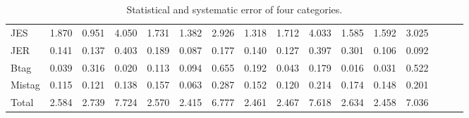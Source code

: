 \begin{sidewaystable}[p]
\begin{tabular}{|l|ccc|ccc|ccc|ccc|ccc|}
  JES                                        & 1.870 & 0.951 & 4.050 & 1.731 & 1.382 & 2.926 & 1.318 & 1.712 & 4.033 & 1.585 & 1.592 & 3.025 \\ 
  JER                                        & 0.141 & 0.137 & 0.403 & 0.189 & 0.087 & 0.177 & 0.140 & 0.127 & 0.397 & 0.301 & 0.106 & 0.092 \\ 
  Btag                                       & 0.039 & 0.316 & 0.020 & 0.113 & 0.094 & 0.655 & 0.192 & 0.043 & 0.179 & 0.016 & 0.031 & 0.522 \\ 
  Mistag                                     & 0.115 & 0.121 & 0.138 & 0.157 & 0.063 & 0.287 & 0.152 & 0.120 & 0.214 & 0.174 & 0.148 & 0.201 \\ 
  \hline
  Total                                      & 2.584 & 2.739 & 7.724 & 2.570 & 2.415 & 6.777 & 2.461 & 2.467 & 7.618 & 2.634 & 2.458 & 7.036 \\ 
  \hline
  \end{tabular}
  \caption{ Statistical and systematic error of four categories. }
  \label{tab:syst_alt}
\end{sidewaystable}
